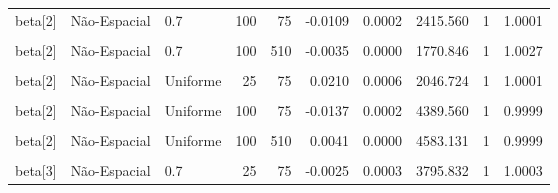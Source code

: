 \documentclass[
]{article}
\begin{document}
\begin{longtable}[t]{lllrrrrrrr}
beta[2] & Não-Espacial & 0.7 & 100 & 75 & -0.0109 & 0.0002 & 2415.560 & 1 & 1.0001\\
\cmidrule{1-10}\pagebreak[0]
\cellcolor{gray!10}{beta[2]} & \cellcolor{gray!10}{Espacial} & \cellcolor{gray!10}{0.7} & \cellcolor{gray!10}{100} & \cellcolor{gray!10}{510} & \cellcolor{gray!10}{-0.0038} & \cellcolor{gray!10}{0.0000} & \cellcolor{gray!10}{1990.989} & \cellcolor{gray!10}{1} & \cellcolor{gray!10}{1.0022}\\
\cmidrule{1-10}\pagebreak[0]
beta[2] & Não-Espacial & 0.7 & 100 & 510 & -0.0035 & 0.0000 & 1770.846 & 1 & 1.0027\\
\cmidrule{1-10}\pagebreak[0]
\cellcolor{gray!10}{beta[2]} & \cellcolor{gray!10}{Espacial} & \cellcolor{gray!10}{Uniforme} & \cellcolor{gray!10}{25} & \cellcolor{gray!10}{75} & \cellcolor{gray!10}{0.0211} & \cellcolor{gray!10}{0.0006} & \cellcolor{gray!10}{2178.165} & \cellcolor{gray!10}{1} & \cellcolor{gray!10}{1.0005}\\
\cmidrule{1-10}\pagebreak[0]
beta[2] & Não-Espacial & Uniforme & 25 & 75 & 0.0210 & 0.0006 & 2046.724 & 1 & 1.0001\\
\cmidrule{1-10}\pagebreak[0]
\cellcolor{gray!10}{beta[2]} & \cellcolor{gray!10}{Espacial} & \cellcolor{gray!10}{Uniforme} & \cellcolor{gray!10}{100} & \cellcolor{gray!10}{75} & \cellcolor{gray!10}{-0.0134} & \cellcolor{gray!10}{0.0002} & \cellcolor{gray!10}{4492.180} & \cellcolor{gray!10}{1} & \cellcolor{gray!10}{1.0001}\\
\cmidrule{1-10}\pagebreak[0]
beta[2] & Não-Espacial & Uniforme & 100 & 75 & -0.0137 & 0.0002 & 4389.560 & 1 & 0.9999\\
\cmidrule{1-10}\pagebreak[0]
\cellcolor{gray!10}{beta[2]} & \cellcolor{gray!10}{Espacial} & \cellcolor{gray!10}{Uniforme} & \cellcolor{gray!10}{100} & \cellcolor{gray!10}{510} & \cellcolor{gray!10}{0.0040} & \cellcolor{gray!10}{0.0000} & \cellcolor{gray!10}{4719.631} & \cellcolor{gray!10}{1} & \cellcolor{gray!10}{0.9999}\\
\cmidrule{1-10}\pagebreak[0]
beta[2] & Não-Espacial & Uniforme & 100 & 510 & 0.0041 & 0.0000 & 4583.131 & 1 & 0.9999\\
\cmidrule{1-10}\pagebreak[0]
\cellcolor{gray!10}{beta[3]} & \cellcolor{gray!10}{Espacial} & \cellcolor{gray!10}{0.7} & \cellcolor{gray!10}{25} & \cellcolor{gray!10}{75} & \cellcolor{gray!10}{-0.0023} & \cellcolor{gray!10}{0.0003} & \cellcolor{gray!10}{3754.120} & \cellcolor{gray!10}{1} & \cellcolor{gray!10}{1.0026}\\
\cmidrule{1-10}\pagebreak[0]
beta[3] & Não-Espacial & 0.7 & 25 & 75 & -0.0025 & 0.0003 & 3795.832 & 1 & 1.0003\\

\end{longtable}
\end{document}
